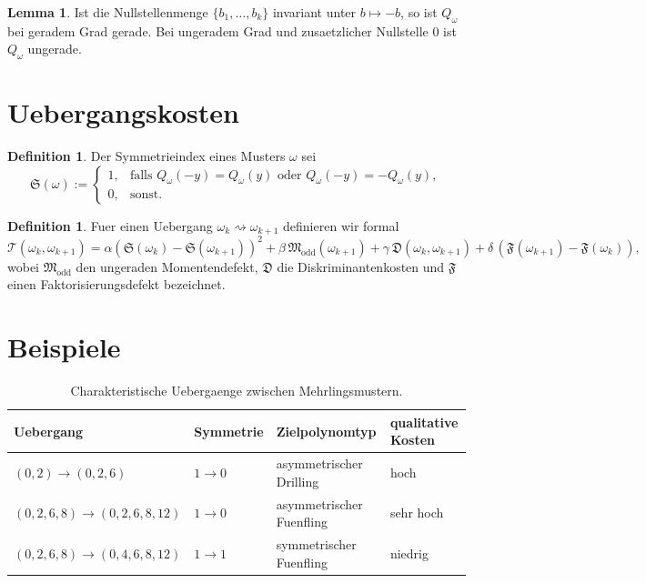 \documentclass[11pt,a4paper]{article}
\theoremstyle{definition}
\newtheorem{lemma}[satz]{Lemma}
\newtheorem{definition}[satz]{Definition}
\begin{document}
\begin{lemma}
Ist die Nullstellenmenge \(\{b_1,\dots,b_k\}\) invariant unter \(b\mapsto -b\), so ist \(Q_\omega\) bei geradem Grad gerade. Bei ungeradem Grad und zusaetzlicher Nullstelle \(0\) ist \(Q_\omega\) ungerade.
\end{lemma}

\section{Uebergangskosten}

\begin{definition}
Der Symmetrieindex eines Musters \(\omega\) sei
\[
\mathfrak S(\omega):=
\begin{cases}
1,& \text{falls } Q_\omega(-y)=Q_\omega(y)\text{ oder }Q_\omega(-y)=-Q_\omega(y),\\
0,& \text{sonst.}
\end{cases}
\]
\end{definition}

\begin{definition}
Fuer einen Uebergang \(\omega_k\rightsquigarrow\omega_{k+1}\) definieren wir formal
\[
\mathcal T(\omega_k,\omega_{k+1})
=
\alpha(\mathfrak S(\omega_k)-\mathfrak S(\omega_{k+1}))^2
+\beta\,\mathfrak M_{\mathrm{odd}}(\omega_{k+1})
+\gamma\,\mathfrak D(\omega_k,\omega_{k+1})
+\delta\,(\mathfrak F(\omega_{k+1})-\mathfrak F(\omega_k)),
\]
wobei \(\mathfrak M_{\mathrm{odd}}\) den ungeraden Momentendefekt, \(\mathfrak D\) die Diskriminantenkosten und \(\mathfrak F\) einen Faktorisierungsdefekt bezeichnet.
\end{definition}

\section{Beispiele}

\begin{table}[h]
\centering
\begin{tabular}{llll}
\toprule
Uebergang & Symmetrie & Zielpolynomtyp & qualitative Kosten \\
\midrule
\((0,2)\to(0,2,6)\) & \(1\to 0\) & asymmetrischer Drilling & hoch \\
\((0,2,6,8)\to(0,2,6,8,12)\) & \(1\to 0\) & asymmetrischer Fuenfling & sehr hoch \\
\((0,2,6,8)\to(0,4,6,8,12)\) & \(1\to 1\) & symmetrischer Fuenfling & niedrig \\
\bottomrule
\end{tabular}
\caption{Charakteristische Uebergaenge zwischen Mehrlingsmustern.}
\end{table}
\end{document}
